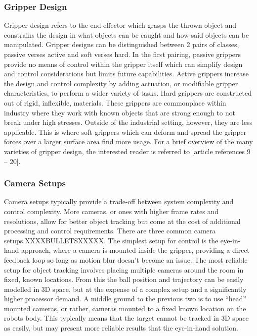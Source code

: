 \documentclass[conference]{IEEEtran}
\begin{document}
\subsubsection{Gripper Design}
Gripper design refers to the end effector which grasps the thrown object and constrains the design in what objects can be caught and how said objects can be manipulated. Gripper designs can be distinguished between 2 pairs of classes, passive verses active and soft verses hard.
In the first pairing, passive grippers provide no means of control within the gripper itself which can simplify design and control considerations but limits future capabilities. Active grippers increase the design and control complexity by adding actuation, or modifiable gripper characteristics, to perform a wider variety of tasks.
Hard grippers are constructed out of rigid, inflexible, materials. These grippers are commonplace within industry where they work with known objects that are strong enough to not break under high stresses. Outside of the industrial setting, however, they are less applicable. This is where soft grippers which can deform and spread the gripper forces over a larger surface area find more usage.
For a brief overview of the many varieties of gripper design, the interested reader is referred to [article references 9 – 20].

\subsubsection{Camera Setups}
Camera setups typically provide a trade-off between system complexity and control complexity. More cameras, or ones with higher frame rates and resolutions, allow for better object tracking but come at the cost of additional processing and control requirements.
There are three common camera setups.XXXXBULLETSXXXXX. The simplest setup for control is the eye-in-hand approach, where a camera is mounted inside the gripper, providing a direct feedback loop so long as motion blur doesn’t become an issue.
The most reliable setup for object tracking involves placing multiple cameras around the room in fixed, known locations. From this the ball position and trajectory can be easily modelled in 3D space, but at the expense of a complex setup and a significantly higher processor demand.
A middle ground to the previous two is to use “head” mounted cameras, or rather, cameras mounted to a fixed known location on the robots body. This typically means that the target cannot be tracked in 3D space as easily, but may present more reliable results that the eye-in-hand solution. 
\end{document}
